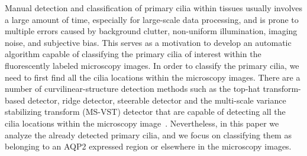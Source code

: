 Manual detection and classification of primary cilia within tissues usually involves a large amount of time, especially for large-scale data processing, and is prone to multiple errors caused by background clutter, non-uniform illumination, imaging noise, and subjective bias. This serves as a motivation to develop an automatic algorithm capable of classifying the primary cilia of interest within the fluorescently labeled microscopy images. In order to classify the primary cilia, we need to first find all the cilia locations within the microscopy images. There are a number of curvilinear-structure detection methods such as the top-hat transform-based detector, ridge detector, steerable detector and the multi-scale variance stabilizing transform (MS-VST) detector that are capable of detecting all the cilia locations within the microscopy image~\cite{ram_dissertation_2017, ram_Vehicle_2016, ram_Three_2018}. Nevertheless, in this paper we analyze the already detected primary cilia, and we focus on classifying them as belonging to an AQP2 expressed region or elsewhere in the microscopy images.
